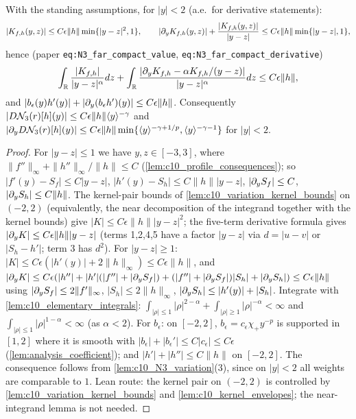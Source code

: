 \begin{lemma}
  \label{lem:c10_N3_compact}
  With the standing assumptions, for $|y|<2$ (a.e.\ for derivative statements):
  \[
    |K_{f,h}(y,z)|\le C\epsilon\|h\|\min\{|y-z|^2,1\},\qquad
    |\partial_yK_{f,h}(y,z)|+\frac{|K_{f,h}(y,z)|}{|y-z|}\le C\epsilon\|h\|\min\{|y-z|,1\},
  \]
  hence (paper \texttt{eq:N3\_far\_compact\_value}, \texttt{eq:N3\_far\_compact\_derivative})
  \[
    \int_{\mathbb{R}}\frac{|K_{f,h}|}{|y-z|^\alpha}dz+\int_{\mathbb{R}}\frac{|\partial_yK_{f,h}-\alpha K_{f,h}/(y-z)|}{|y-z|^\alpha}dz\le C\epsilon\|h\|,
  \]
  and $|b_\epsilon(y)h'(y)|+|\partial_y(b_\epsilon h')(y)|\le C\epsilon\|h\|$. Consequently
  $|D\mathcal{N}_3(r)[h](y)|\le C\epsilon\|h\|\langle y \rangle^{-\gamma}$ and
  $|\partial_yD\mathcal{N}_3(r)[h](y)|\le C\epsilon\|h\|\min\{\langle y \rangle^{-\gamma+1/p},\langle y \rangle^{-\gamma-1}\}$ for $|y|<2$.
\end{lemma}
\begin{proof}
  For $|y-z|\le1$ we have $y,z\in[-3,3]$, where $\|f''\|_\infty+\|h''\|_\infty/\|h\|\le C$
  (\cref{lem:c10_profile_consequences}); so $|f'(y)-S_f|\le C|y-z|$, $|h'(y)-S_h|\le C\|h\||y-z|$,
  $|\partial_yS_f|\le C$, $|\partial_yS_h|\le C\|h\|$. The kernel-pair bounds of \cref{lem:c10_variation_kernel_bounds} on $(-2,2)$ (equivalently, the near
  decomposition of the integrand together with the kernel bounds) give $|K|\le C\epsilon\|h\||y-z|^2$; the five-term derivative formula gives
  $|\partial_yK|\le C\epsilon\|h\||y-z|$ (terms 1,2,4,5 have a factor $|y-z|$ via $d=|u-v|$ or $|S_h-h'|$; term 3 has $d^2$).
  For $|y-z|\ge1$: $|K|\le C\epsilon(|h'(y)|+2\|h\|_\infty)\le C\epsilon\|h\|$, and
  $|\partial_yK|\le C\epsilon(|h''|+|h'|(|f''|+|\partial_yS_f|)+(|f''|+|\partial_yS_f|)|S_h|+|\partial_yS_h|)\le C\epsilon\|h\|$ using
  $|\partial_yS_f|\le2\|f'\|_\infty$, $|S_h|\le2\|h\|_\infty$, $|\partial_yS_h|\le|h'(y)|+|S_h|$.
  Integrate with \cref{lem:c10_elementary_integrals}: $\int_{|\rho|\le1}|\rho|^{2-\alpha}+\int_{|\rho|\ge1}|\rho|^{-\alpha}<\infty$ and
  $\int_{|\rho|\le1}|\rho|^{1-\alpha}<\infty$ (as $\alpha<2$).
  For $b_\epsilon$: on $[-2,2]$, $b_\epsilon=c_\epsilon\chi_+y^{-p}$ is supported in $[1,2]$ where it is smooth
  with $|b_\epsilon|+|b_\epsilon'|\le C|c_\epsilon|\le C\epsilon$ (\cref{lem:analysis_coefficient}); and
  $|h'|+|h''|\le C\|h\|$ on $[-2,2]$.
  The consequence follows from \cref{lem:c10_N3_variation}(3), since on $|y|<2$ all weights are comparable to $1$.
  Lean route: the kernel pair on $(-2,2)$ is controlled by \cref{lem:c10_variation_kernel_bounds} and \cref{lem:c10_kernel_envelopes}; the near-integrand lemma is not needed.
\end{proof}

